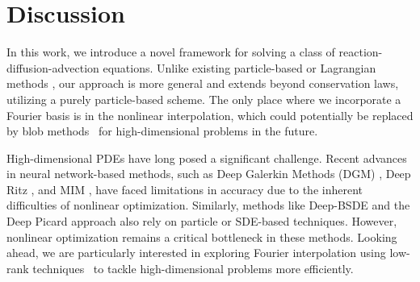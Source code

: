 \documentclass[12pt]{article}
\begin{document}
\section{Discussion}
In this work, we introduce a novel framework for solving a class of reaction-diffusion-advection equations. Unlike existing particle-based or Lagrangian methods \cite{qiu2010conservative, qiu2011positivity, wang2025novel, carrillo_interacting_2024}, our approach is more general and extends beyond conservation laws, utilizing a purely particle-based scheme. The only place where we incorporate a Fourier basis is in the nonlinear interpolation, which could potentially be replaced by blob methods~\cite{campos2018convergence,craig2016blob,goodman1990convergence,hauray2009wasserstein} for high-dimensional problems in the future.

High-dimensional PDEs have long posed a significant challenge. Recent advances in neural network-based methods, such as Deep Galerkin Methods (DGM) \cite{sirignano2018dgm}, Deep Ritz \cite{yu2018deep}, and MIM \cite{lyu2022mim}, have faced limitations in accuracy due to the inherent difficulties of nonlinear optimization. Similarly, methods like Deep-BSDE \cite{han2018solving} and the Deep Picard approach \cite{han2024deep} also rely on particle or SDE-based techniques. However, nonlinear optimization remains a critical bottleneck in these methods. Looking ahead, we are particularly interested in exploring Fourier interpolation using low-rank techniques~\cite{tang2025solving} to tackle high-dimensional problems more efficiently.





\clearpage
\end{document}
